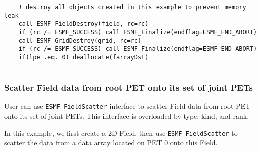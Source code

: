 \begin{verbatim}
    ! destroy all objects created in this example to prevent memory leak
    call ESMF_FieldDestroy(field, rc=rc)
    if (rc /= ESMF_SUCCESS) call ESMF_Finalize(endflag=ESMF_END_ABORT)
    call ESMF_GridDestroy(grid, rc=rc)
    if (rc /= ESMF_SUCCESS) call ESMF_Finalize(endflag=ESMF_END_ABORT)
    if(lpe .eq. 0) deallocate(farrayDst)
 
\end{verbatim}
 

   \subsubsection{Scatter Field data from root PET onto its set of joint PETs}
   \label{sec:field:usage:scatter_2dptr}
  
   User can use {\tt ESMF\_FieldScatter} interface to scatter Field data from root
   PET onto its set of joint PETs. This interface is overloaded by type, kind, and rank.
   
   In this example, we first create a 2D Field, then use {\tt ESMF\_FieldScatter} to
   scatter the data from a data array located on PET 0 onto this Field. 

